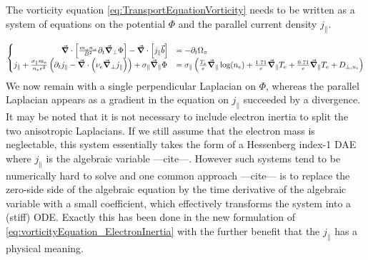 The vorticity equation \autoref{eq:TransportEquationVorticity} needs to be written as a system of equations on the potential $\Phi$ and the parallel current density $j_\parallel$.

\begin{equation}
	\label{eq:vorticityEquation_ElectronInertia}
	\begin{cases}
		\qquad\qquad\qquad\vec{\grad}\cdot\left[\frac{m_\alpha n_\alpha}{ B^2}\partial_t\vec{\grad}_\perp\Phi\right] - \vec{\grad}\cdot\left[j_\parallel\vec{b}\right]&=  - \partial_t \Omega_\pi \\
		j_\parallel + \frac{\sigma_\parallel m_e}{n_ee^2} \left(\partial_t j_\parallel - \vec{\grad}\cdot\left(\nu_e\vec{\grad}_\perp j_\parallel\right)\right) + \sigma_\parallel \vec{\grad}_\parallel\Phi &= \sigma_\parallel \left(\frac{T_e}{e}\vec{\grad}_\parallel\log(n_e) + \frac{1.71}{e}\vec{\grad}_\parallel T_e + \frac{0.71}{e}\vec{\grad}_\parallel T_e + D_{\perp,u_i}\right)
	\end{cases}
\end{equation}
We now remain with a single perpendicular Laplacian on $\Phi$, whereas the parallel Laplacian appears as a gradient in the equation on $j_\parallel$ succeeded by a divergence. It may be noted that it is not necessary to include electron inertia to split the two anisotropic Laplacians. If we still assume that the electron mass is neglectable, this system essentially takes the form of a Hessenberg index-1 DAE where $j_\parallel$ is the algebraic variable ---cite---. However such systems tend to be numerically hard to solve and one common approach ---cite--- is to replace the zero-side side of the algebraic equation by the time derivative of the algebraic variable with a small coefficient, which effectively transforms the system into a (stiff) ODE. Exactly this has been done in the new formulation of \autoref{eq:vorticityEquation_ElectronInertia} with the further benefit that the $j_\parallel$ has a physical meaning.


